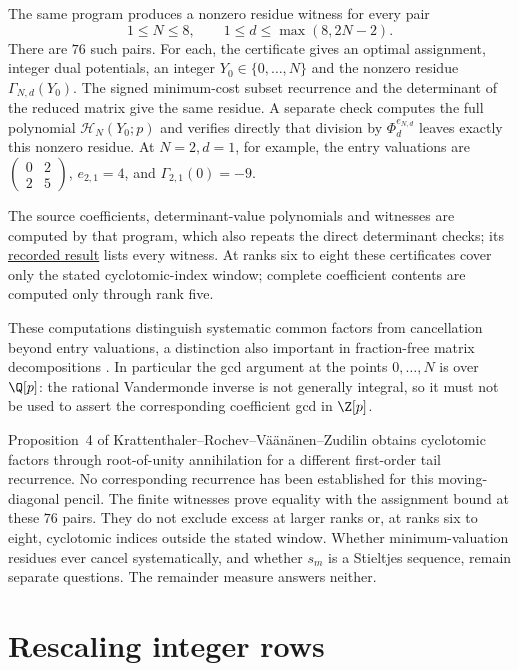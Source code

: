 The same program produces a nonzero residue witness for every pair
\[
 1\le N\le8,\qquad 1\le d\le\max(8,2N-2).
\]
There are $76$ such pairs. For each, the certificate gives an optimal
assignment, integer dual potentials, an integer $Y_0\in\{0,\ldots,N\}$
and the nonzero residue $\Gamma_{N,d}(Y_0)$. The signed
minimum-cost subset recurrence and the determinant of the reduced
matrix give the same residue. A separate check computes the full
polynomial $\mathcal H_N(Y_0;p)$ and verifies directly that division
by $\Phi_d^{e_{N,d}}$ leaves exactly this nonzero residue.
At $N=2,d=1$, for example, the entry valuations are
$\left(\begin{smallmatrix}0&2\\2&5\end{smallmatrix}\right)$,
$e_{2,1}=4$, and $\Gamma_{2,1}(0)=-9$.

The source coefficients, determinant-value polynomials and witnesses
are computed by that program, which also repeats the direct
determinant checks; its \href{https://github.com/wcook04/plectis-erdos/blob/4beca4ad0c00a626def9c73f2420e20ebf8d1968/research/experiments/erdos1049/receipts/cyclotomic-content.json}{recorded result} lists every witness. At ranks six to eight
these certificates cover only the stated cyclotomic-index window;
complete coefficient contents are computed only through rank five.

These computations distinguish systematic common factors from
cancellation beyond entry valuations, a distinction also important in
fraction-free matrix decompositions \cite[Sec.~2; Thm.~6]{middeke2021}.
In particular the gcd argument at the points $0,\ldots,N$ is over
$\Q[p]$: the rational Vandermonde inverse is not generally integral, so
it must not be used to assert the corresponding coefficient gcd in $\Z[p]$.


Proposition~4 of Krattenthaler--Rochev--V\"a\"an\"anen--Zudilin
\cite[pp.~14--15; (4.10), p.~17]{krvz2009} obtains cyclotomic factors
through root-of-unity annihilation for a different first-order tail
recurrence. No corresponding recurrence has been established for this
moving-diagonal pencil. The finite witnesses prove equality with the assignment bound at
these $76$ pairs. They do not exclude excess at larger ranks or, at
ranks six to eight, cyclotomic indices outside the stated window. Whether minimum-valuation residues ever cancel
systematically, and whether $s_m$ is a Stieltjes sequence, remain separate
questions. The remainder measure answers neither.

\section{Rescaling integer rows}\label{long1049:sec:primitive}

